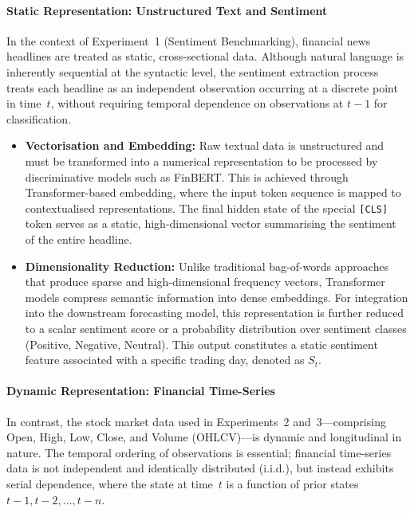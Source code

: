 \documentclass[singlespace]{ucetd}
\begin{document}
\paragraph{Static Representation: Unstructured Text and Sentiment}

In the context of Experiment~1 (Sentiment Benchmarking), financial news headlines are treated as static, cross-sectional data. Although natural language is inherently sequential at the syntactic level, the sentiment extraction process treats each headline as an independent observation occurring at a discrete point in time~$t$, without requiring temporal dependence on observations at $t-1$ for classification.

\begin{itemize}
    \item \textbf{Vectorisation and Embedding:}  
    Raw textual data is unstructured and must be transformed into a numerical representation to be processed by discriminative models such as FinBERT. This is achieved through Transformer-based embedding, where the input token sequence is mapped to contextualised representations. The final hidden state of the special \texttt{[CLS]} token serves as a static, high-dimensional vector summarising the sentiment of the entire headline.

    \item \textbf{Dimensionality Reduction:}  
    Unlike traditional bag-of-words approaches that produce sparse and high-dimensional frequency vectors, Transformer models compress semantic information into dense embeddings. For integration into the downstream forecasting model, this representation is further reduced to a scalar sentiment score or a probability distribution over sentiment classes (Positive, Negative, Neutral). This output constitutes a static sentiment feature associated with a specific trading day, denoted as $S_t$.
\end{itemize}

\paragraph{Dynamic Representation: Financial Time-Series}

In contrast, the stock market data used in Experiments~2 and~3—comprising Open, High, Low, Close, and Volume (OHLCV)—is dynamic and longitudinal in nature. The temporal ordering of observations is essential; financial time-series data is not independent and identically distributed (i.i.d.), but instead exhibits serial dependence, where the state at time~$t$ is a function of prior states $t-1, t-2, \dots, t-n$.
\end{document}
